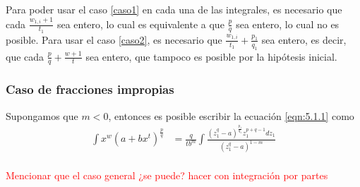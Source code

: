 Para poder usar el caso \ref{caso1} en cada una de las integrales, es necesario que cada  $\frac{w_{1,i}+1}{t_1}$ sea entero, lo cual es equivalente a que $\frac{p}{q}$ sea entero, lo cual no es posible. Para usar el caso \ref{caso2}, es necesario que $\frac{w_{1,i}}{t_1}+\frac{p_1}{q_1}$ sea entero, es decir, que cada $\frac{p}{q}+\frac{w+1}{t}$ sea entero, que tampoco es posible por la hipótesis inicial.

\subsubsection{Caso de fracciones impropias}
Supongamos que $m<0$, entonces es posible escribir la ecuación \ref{eqn:5.1.1} como
\begin{align*}
	\int x^w (a+bx^t)^{\frac{p}{q}}&=\frac{q}{tb^{m}}\int \frac{(z_1^q-a)^{\frac{p_1}{q_1}}z_1^{p+q-1}dz_1}{(z_1^q-a)^{1-m}}\\
\end{align*}

\textcolor{red}{Mencionar que el caso general ¿se puede? hacer con integración por partes}
